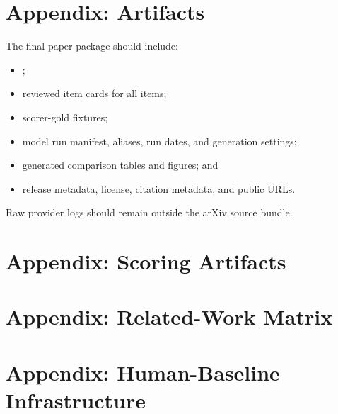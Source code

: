 \appendix

\section{Appendix: Artifacts}

The final paper package should include:

\begin{itemize}
  \item {};
  \item reviewed item cards for all \paperSplit{} items;
  \item scorer-gold fixtures;
  \item model run manifest, aliases, run dates, and generation settings;
  \item generated comparison tables and figures; and
  \item release metadata, license, citation metadata, and public URLs.
\end{itemize}

Raw provider logs should remain outside the arXiv source bundle.

\section{Appendix: Scoring Artifacts}

\begin{table}[H]
  \centering
  \caption{Current scorer-gold fixture coverage.}
  \label{tab:scorer-gold-coverage}
  
\end{table}

\begin{table}[H]
  \centering
  \caption{Evidence-run model manifest summary for the first-draft
  \paperSplit{} results. The full manifest records every model-setting label,
  model identifier, and summary directory.}
  \label{tab:model-panel}
  
\end{table}

\section{Appendix: Related-Work Matrix}



\section{Appendix: Human-Baseline Infrastructure}

